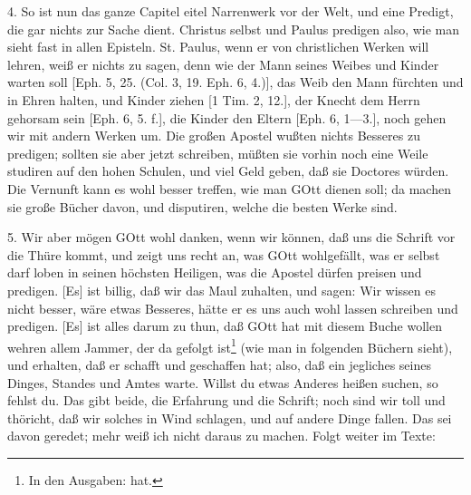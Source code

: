 4. So ist nun das ganze Capitel eitel Narrenwerk vor der Welt, und eine Predigt, die gar nichts zur Sache dient. Christus selbst und Paulus predigen also, wie man sieht fast in allen Episteln. St. Paulus, wenn er von christlichen Werken will lehren, weiß er nichts zu sagen, denn wie der Mann seines Weibes und Kinder warten soll [Eph. 5, 25. (Col. 3, 19. Eph. 6, 4.)], das Weib den Mann fürchten und in Ehren halten, und Kinder ziehen [1 Tim. 2, 12.], der Knecht dem Herrn gehorsam sein [Eph. 6, 5. f.], die Kinder den Eltern [Eph. 6, 1—3.], noch gehen wir mit andern Werken um. Die großen Apostel wußten nichts Besseres zu predigen; sollten sie aber jetzt schreiben, müßten sie vorhin noch eine Weile studiren auf den hohen Schulen, und viel Geld geben, daß sie Doctores würden. Die Vernunft kann es wohl besser treffen, wie man GOtt dienen soll; da machen sie große Bücher davon, und disputiren, welche die besten Werke sind.

5. Wir aber mögen GOtt wohl danken, wenn wir können, daß uns die Schrift vor die Thüre kommt, und zeigt uns recht an, was GOtt wohlgefällt, was er selbst darf loben in seinen höchsten Heiligen, was die Apostel dürfen preisen und predigen. [Es] ist billig, daß wir das Maul zuhalten, und sagen: Wir wissen es nicht besser, wäre etwas Besseres, hätte er es uns auch wohl lassen schreiben und predigen. [Es] ist alles darum zu thun, daß GOtt hat mit diesem Buche wollen wehren allem Jammer, der da gefolgt ist\footnote{In den Ausgaben: hat.} (wie man in folgenden Büchern sieht), und erhalten, daß er schafft und geschaffen hat; also, daß ein jegliches seines Dinges, Standes und Amtes warte. Willst du etwas Anderes heißen suchen, so fehlst du. Das gibt beide, die Erfahrung und die Schrift; noch sind wir toll und thöricht, daß wir solches in Wind schlagen, und auf andere Dinge fallen. Das sei davon geredet; mehr weiß ich nicht daraus zu machen. Folgt weiter im Texte:

